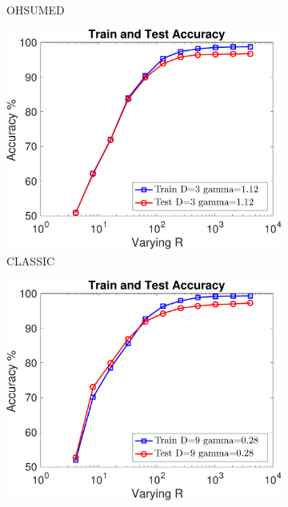 \documentclass[11pt,a4paper]{article}
\newcommand{\1}{\boldsymbol{1}}
\begin{document}
\begin{figure}[htb]
\begin{subfigure}[b]{0.23\textwidth}
      \caption{OHSUMED}
      \label{App:fig:exptsA_varyingR_ohsumed}
      \end{subfigure}
		\begin{subfigure}[b]{0.23\textwidth}
      \includegraphics[width=\textwidth]{Graphs/wmdk_varyingR/classic_random_VaryingR_allSplits_CV_R512-eps-converted-to.pdf}
      \caption{CLASSIC}
      \label{App:fig:exptsA_varyingR_classic}
      \end{subfigure}
      \begin{subfigure}[b]{0.23\textwidth}
      \includegraphics[width=\textwidth]{Graphs/wmdk_varyingR/r8_random_VaryingR_allSplits_CV_R512-eps-converted-to.pdf}

\end{subfigure}
\end{figure}
\end{document}
